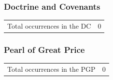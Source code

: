 	\subsubsection{Doctrine and Covenants} %
		\label{INTERCESSION-DC}
	
		\begin{tabular}{ll}
			Total occurrences in the DC & 0
		\end{tabular}
		
	\subsubsection{Pearl of Great Price} %
		\label{INTERCESSION-PGP}
	
		\begin{tabular}{ll}
			Total occurrences in the PGP & 0
		\end{tabular}
		

	


	
	
